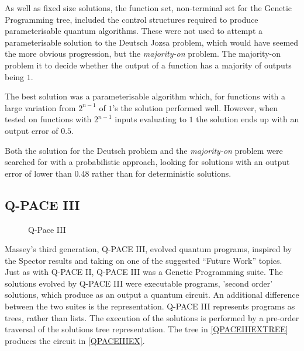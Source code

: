 As well as fixed size solutions, the function set, non-terminal set for the Genetic Programming tree, included the control structures required to produce parameterisable quantum algorithms.
These were not used to attempt a parameterisable solution to the Deutsch Jozsa problem, which would have seemed the more obvious progression, but the \emph{majority-on} problem.
The majority-on problem it to decide whether the output of a function has a majority of outputs being $1$.

The best solution was a parameterisable algorithm which, for functions with a large variation from $2^{n-1}$ of $1$'s the solution performed well.
However, when tested on functions with $2^{n-1}$ inputs evaluating to $1$ the solution ends up with an output error of $0.5$.

Both the solution for the Deutsch problem and the \emph{majority-on} problem were searched for with a probabilistic approach, looking for solutions with an output error of lower than 0.48 rather than for deterministic solutions.

\subsection{Q-PACE III}

\begin{figure}
\begin{center}

\hspace{20pt}            
\end{center}
\caption{Q-Pace III}
\end{figure}

Massey's third generation, Q-PACE III, evolved quantum programs, inspired by the Spector\cite{LSpectorGPforQC,LSpectorANDOR,Spector:1999:QCA:316573.317112} results and taking on one of the suggested ``Future Work'' topics.
Just as with Q-PACE II, Q-PACE III was a Genetic Programming suite.
The solutions evolved by Q-PACE III were executable programs, 'second order' solutions, which produce as an output a quantum circuit.
An additional difference between the two suites is the representation.
Q-PACE III represents programs as trees, rather than lists.
The execution of the solutions is performed by a pre-order traversal of the solutions tree representation.
The tree in \ref{QPACEIIIEXTREE} produces the circuit in \ref{QPACEIIIEX}.

